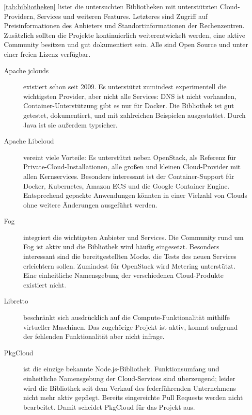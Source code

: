 \autoref*{tab:bibliotheken} listet die untersuchten Bibliotheken mit unterstützten Cloud-Providern, Services und weiteren Features. Letzteres sind Zugriff auf Preisinformationen des Anbieters und Standortinformationen der Rechenzentren. Zusätzlich sollten die Projekte kontinuierlich weiterentwickelt werden, eine aktive Community besitzen und gut dokumentiert sein. Alle sind Open Source und unter einer freien Lizenz verfügbar.

\begin{description}
	
	\item[Apache jclouds] existiert schon seit 2009. Es unterstützt zumindest experimentell die wichtigsten Provider, aber nicht alle Services: DNS ist nicht vorhanden, Container-Unterstützung gibt es nur für Docker. Die Bibliothek ist gut getestet, dokumentiert, und mit zahlreichen Beispielen ausgestattet. Durch Java ist sie außerdem typsicher.

	\item[Apache Libcloud] vereint viele Vorteile: Es unterstützt neben OpenStack, als Referenz für Private-Cloud-Installationen, alle großen und kleinen Cloud-Provider mit allen Kernservices. Besonders interessant ist der Container-Support für Docker, Kubernetes, Amazon ECS und die Google Container Engine. Entsprechend gepackte Anwendungen könnten in einer Vielzahl von Clouds ohne weitere Änderungen ausgeführt werden.

	\item[Fog] integriert die wichtigsten Anbieter und Services. Die Community rund um Fog ist aktiv und die Bibliothek wird häufig eingesetzt. Besonders interessant sind die bereitgestellten Mocks, die Tests des neuen Services erleichtern sollen. Zumindest für OpenStack wird Metering unterstützt. Eine einheitliche Namensgebung der verschiedenen Cloud-Produkte existiert nicht.

	\item[Libretto] beschränkt sich ausdrücklich auf die Compute-Funktionalität mithilfe virtueller Maschinen. Das zugehörige Projekt ist aktiv, kommt aufgrund der fehlenden Funktionalität aber nicht infrage.

	\item[PkgCloud] ist die einzige bekannte Node.js-Bibliothek. Funktionsumfang und einheitliche Namensgebung der Cloud-Services sind überzeugend; leider wird die Bibliothek seit dem Verkauf des federführenden Unternehmens nicht mehr aktiv gepflegt. Bereits eingereichte Pull Requests werden nicht bearbeitet. Damit scheidet PkgCloud für das Projekt aus.

\end{description}

